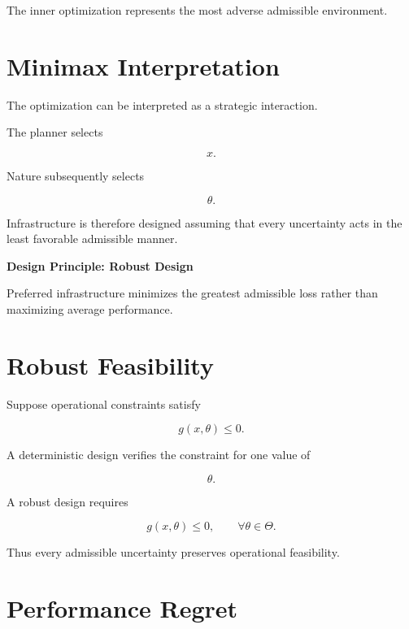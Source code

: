 \documentclass[11pt,fleqn]{book}
\numberwithin{equation}{chapter}
\newenvironment{principle}[1]
  {\begin{principleEnv}
   \noindent\textbf{Design Principle: #1}\par\smallskip\itshape}
  {\end{principleEnv}}
\theoremstyle{plain}
\theoremstyle{definition}
\theoremstyle{remark}
\begin{document}
The inner optimization represents the most adverse admissible
environment.


\section{Minimax Interpretation}

The optimization can be interpreted as a strategic interaction.

The planner selects

\[
x.
\]

Nature subsequently selects

\[
\theta.
\]

Infrastructure is therefore designed assuming that every uncertainty acts
in the least favorable admissible manner.


\begin{principle}{Robust Design}

Preferred infrastructure minimizes the greatest admissible loss rather
than maximizing average performance.

\end{principle}


\section{Robust Feasibility}

Suppose operational constraints satisfy

\[
g(x,\theta)\le0.
\]

A deterministic design verifies the constraint for one value of

\[
\theta.
\]

A robust design requires

\[
\boxed{
g(x,\theta)\le0,
\qquad
\forall\theta\in\Theta.
}
\]

Thus every admissible uncertainty preserves operational feasibility.


\section{Performance Regret}
\end{document}
